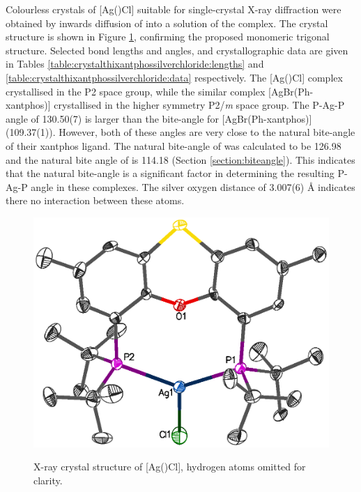 Colourless crystals of [Ag(\tButhixantphos)Cl] suitable for single-crystal X-ray diffraction were obtained by inwards diffusion of  into a  solution of the complex.  The crystal structure is shown in Figure \ref{Crystalthixantphossilverchloride}, confirming the proposed monomeric trigonal structure.  Selected bond lengths and angles, and crystallographic data are given in Tables \ref{table:crystalthixantphossilverchloride:lengths} and \ref{table:crystalthixantphossilverchloride:data} respectively.  The [Ag(\tButhixantphos)Cl] complex crystallised in the P2 space group, while the similar complex [AgBr(Ph-xantphos)] crystallised in the higher symmetry P2/\emph{m} space group.\cite{Kaltzoglou2007}  The P-Ag-P angle of 130.50(7)\degrees{} is larger than the bite-angle for [AgBr(Ph-xantphos)] (109.37(1)\degrees{}).  However, both of these angles are very close to the natural bite-angle of their xantphos ligand.  The natural bite-angle of \tButhixantphos{} was calculated to be 126.98\degrees{} and the natural bite angle of \Phxantphos{} is 114.18\degrees{} (Section \ref{section:biteangle}).  This indicates that the natural bite-angle is a significant factor in determining the resulting P-Ag-P angle in these complexes.  The silver oxygen distance of 3.007(6) \si{\angstrom} indicates there no interaction between these atoms.


\begin{figure}[htbp]
\begin{center}
\vspace{0.5cm}
\includegraphics[scale=0.8]{../Figures/Crystalthixantphossilverchloride.eps}
\caption[X-ray crystal structure of [Ag(\tButhixantphos)Cl{]}]{X-ray crystal structure of [Ag(\tButhixantphos)Cl], hydrogen atoms omitted for clarity.}
\vspace{0.2cm}
\label{Crystalthixantphossilverchloride}
\vspace{0.2cm}
\end{center}
\end{figure}
\vspace{0.2cm}



